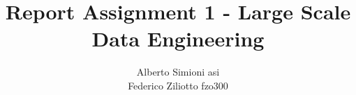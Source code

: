 



\title{Report Assignment 1 - Large Scale Data Engineering}



\author{
Alberto Simioni \hspace asi\\
Federico Ziliotto \hspace fzo300
}



\date{}












\maketitle


%
%
%
%





